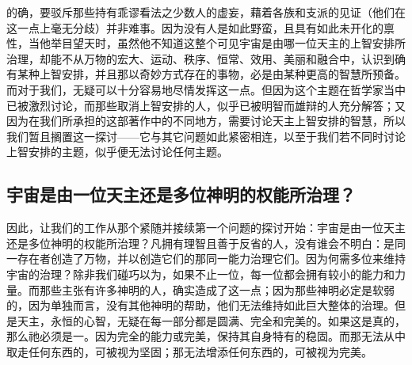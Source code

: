 的确，要驳斥那些持有乖谬看法之少数人的虚妄，藉着各族和支派的见证（他们在这一点上毫无分歧）并非难事。因为没有人是如此野蛮，且具有如此未开化的禀性，当他举目望天时，虽然他不知道这整个可见宇宙是由哪一位天主的上智安排所治理，却能不从万物的宏大、运动、秩序、恒常、效用、美丽和融合中，认识到确有某种上智安排，并且那以奇妙方式存在的事物，必是由某种更高的智慧所预备。而对于我们，无疑可以十分容易地尽情发挥这一点。但因为这个主题在哲学家当中已被激烈讨论，而那些取消上智安排的人，似乎已被明智而雄辩的人充分解答；又因为在我们所承担的这部著作中的不同地方，需要讨论天主上智安排的智慧，所以我们暂且搁置这一探讨——它与其它问题如此紧密相连，以至于我们若不同时讨论上智安排的主题，似乎便无法讨论任何主题。\par


\subsection{宇宙是由一位天主还是多位神明的权能所治理？}

因此，让我们的工作从那个紧随并接续第一个问题的探讨开始：宇宙是由一位天主还是多位神明的权能所治理？凡拥有理智且善于反省的人，没有谁会不明白：是同一存在者创造了万物，并以创造它们的那同一能力治理它们。因为何需多位来维持宇宙的治理？除非我们碰巧以为，如果不止一位，每一位都会拥有较小的能力和力量。而那些主张有许多神明的人，确实造成了这一点；因为那些神明必定是软弱的，因为单独而言，没有其他神明的帮助，他们无法维持如此巨大整体的治理。但是天主，永恒的心智，无疑在每一部分都是圆满、完全和完美的。如果这是真的，那么祂必须是一。因为完全的能力或完美，保持其自身特有的稳固。而那无法从中取走任何东西的，可被视为坚固；那无法增添任何东西的，可被视为完美。\par

